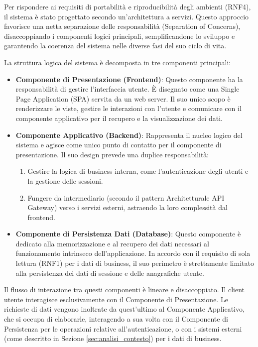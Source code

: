 \documentclass[12pt,a4paper,openright,twoside]{book}
\begin{document}
Per rispondere ai requisiti di portabilità e riproducibilità degli ambienti (RNF4), il sistema è stato progettato secondo un'architettura a servizi. Questo approccio favorisce una netta separazione delle responsabilità (Separation of Concerns), disaccoppiando i componenti logici principali, semplificandone lo sviluppo e garantendo la coerenza del sistema nelle diverse fasi del suo ciclo di vita.

La struttura logica del sistema è decomposta in tre componenti principali:

\begin{itemize}
    \item \textbf{Componente di Presentazione (Frontend)}: Questo componente ha la responsabilità di gestire l'interfaccia utente. È disegnato come una Single Page Application (SPA) servita da un web server. Il suo unico scopo è renderizzare le viste, gestire le interazioni con l'utente e comunicare con il componente applicativo per il recupero e la visualizzazione dei dati.

    \item \textbf{Componente Applicativo (Backend)}: Rappresenta il nucleo logico del sistema e agisce come unico punto di contatto per il componente di presentazione. Il suo design prevede una duplice responsabilità:
          \begin{enumerate}
              \item Gestire la logica di business interna, come l'autenticazione degli utenti e la gestione delle sessioni.
              \item Fungere da intermediario (secondo il pattern Architetturale API Gateway) verso i servizi esterni, astraendo la loro complessità dal frontend.
          \end{enumerate}

    \item \textbf{Componente di Persistenza Dati (Database)}: Questo componente è dedicato alla memorizzazione e al recupero dei dati necessari al funzionamento intrinseco dell'applicazione. In accordo con il requisito di sola lettura (RNF1) per i dati di business, il suo perimetro è strettamente limitato alla persistenza dei dati di sessione e delle anagrafiche utente.
\end{itemize}

Il flusso di interazione tra questi componenti è lineare e disaccoppiato. Il client utente interagisce esclusivamente con il Componente di Presentazione. Le richieste di dati vengono inoltrate da quest'ultimo al Componente Applicativo, che si occupa di elaborarle, interagendo a sua volta con il Componente di Persistenza per le operazioni relative all'autenticazione, o con i sistemi esterni (come descritto in Sezione \ref{sec:analisi_contesto}) per i dati di business.
\end{document}
